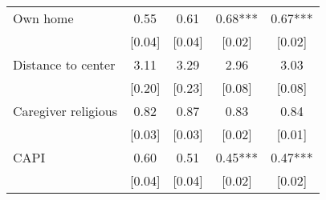\begin{table}[H]
\begin{adjustbox}{max height=\dimexpr\textheight-5.5cm\relax,max width=\textwidth}
\begin{tabular}{l cccc}
Own home  & 0.55 & 0.61 & 0.68*** & 0.67*** \\
 & [0.04] & [0.04] & [0.02] & [0.02] \\
Distance to center  & 3.11 & 3.29 & 2.96 & 3.03 \\
 & [0.20] & [0.23] & [0.08] & [0.08] \\
Caregiver religious & 0.82 & 0.87 & 0.83 & 0.84 \\
 & [0.03] & [0.03] & [0.02] & [0.01] \\
CAPI  & 0.60 & 0.51 & 0.45*** & 0.47*** \\
 & [0.04] & [0.04] & [0.02] & [0.02] \\
\hline
\end{tabular}
\end{adjustbox}

\end{table}
